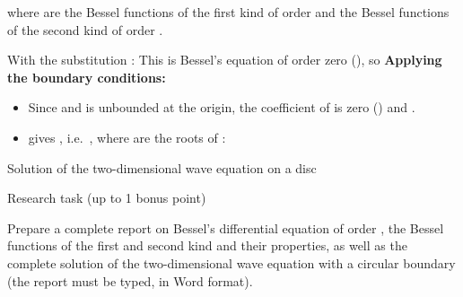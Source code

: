 

where  are the Bessel functions of the first kind of order  and  the Bessel functions of the second kind of order .


With the substitution :
This is Bessel's equation of order zero (), so
\textbf{Applying the boundary conditions:}

\begin{itemize}
\tightlist
\item
  Since  and  is unbounded at the origin, the coefficient of  is zero () and .
\item
   gives , i.e.~, where  are the roots of :
\end{itemize}



\begin{EMimportant}{Solution of the two-dimensional wave equation on a disc}


\end{EMimportant}

\begin{EMremark}{Research task (up to 1 bonus point)}

Prepare a complete report on Bessel's differential equation of order , the Bessel functions of the first and second kind and their properties, as well as the complete solution of the two-dimensional wave equation with a circular boundary (the report must be typed, in Word format).

\end{EMremark}
